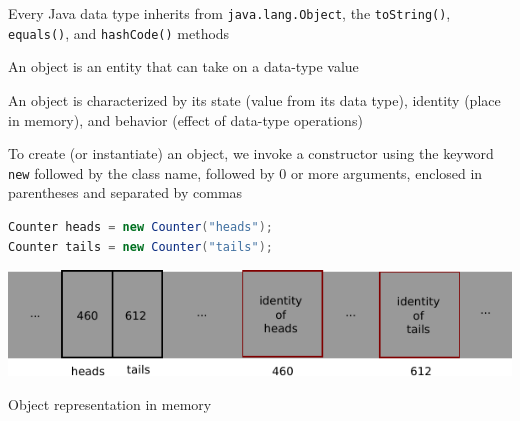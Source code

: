 \documentclass[8pt,a4paper,compress]{beamer}
\begin{document}
\begin{frame}[fragile]
Every Java data type inherits from \lstinline{java.lang.Object}, the \lstinline{toString()}, \lstinline{equals()}, and \lstinline{hashCode()} methods

\bigskip

An object is an entity that can take on a data-type value

\bigskip

An object is characterized by its state (value from its data type), identity (place in memory), and behavior (effect of data-type operations)

\bigskip

To create (or instantiate) an object, we invoke a constructor using the keyword \lstinline{new} followed by the class name, followed by 0 or more arguments, enclosed in parentheses and separated by commas

\begin{lstlisting}[language=Java]
Counter heads = new Counter("heads");
Counter tails = new Counter("tails");
\end{lstlisting}

\begin{center}
\includegraphics[scale=0.8]{./figures/obj_rep.pdf}

\smallskip

\tiny Object representation in memory
\end{center}
\end{frame}
\end{document}
